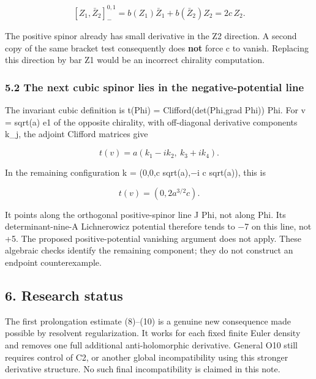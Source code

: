 \[
 [Z_1,\bar Z_2]^{0,1}_-
 =b(Z_1)\bar Z_1+b(\bar Z_2)Z_2
 =2c\,Z_2.
\]

The positive spinor already has small derivative in the Z2 direction. A
second copy of the same bracket test consequently does \textbf{not}
force c to vanish. Replacing this direction by bar Z1 would be an
incorrect chirality computation.

\hypertarget{o10prolong:the-next-cubic-spinor-lies-in-the-negative-potential-line}{%
\subsubsection{5.2 The next cubic spinor lies in the negative-potential
line}\label{o10prolong:the-next-cubic-spinor-lies-in-the-negative-potential-line}}

The invariant cubic definition is t(Phi) = Clifford(det(Phi,grad Phi))
Phi. For v = sqrt(a) e1 of the opposite chirality, with off-diagonal
derivative components k\_j, the adjoint Clifford matrices give

\[
 t(v)=a(k_1-ik_2,\ k_3+ik_4).
\]

In the remaining configuration k = (0,0,c sqrt(a),−i c sqrt(a)), this is

\[
 t(v)=(0,2a^{3/2}c).
\]

It points along the orthogonal positive-spinor line J Phi, not along
Phi. Its determinant-nine-A Lichnerowicz potential therefore tends to −7
on this line, not +5. The proposed positive-potential vanishing argument
does not apply. These algebraic checks identify the remaining component;
they do not construct an endpoint counterexample.

\hypertarget{o10prolong:research-status}{%
\subsection{6. Research status}\label{o10prolong:research-status}}

The first prolongation estimate (8)--(10) is a genuine new consequence
made possible by resolvent regularization. It works for each fixed
finite Euler density and removes one full additional anti-holomorphic
derivative. General O10 still requires control of C2, or another global
incompatibility using this stronger derivative structure. No such final
incompatibility is claimed in this note.

